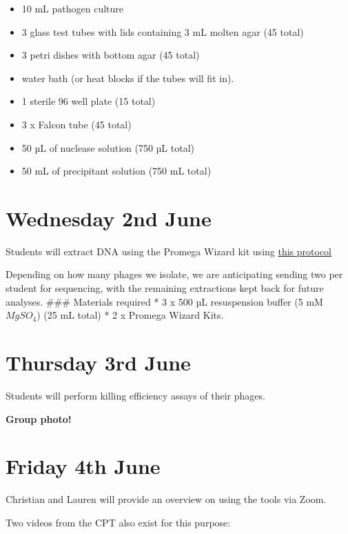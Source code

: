 \documentclass[
]{book}
\providecommand{\tightlist}{%
  \setlength{\itemsep}{0pt}\setlength{\parskip}{0pt}}
\begin{document}
\begin{itemize}
\tightlist
\item
  10 mL pathogen culture
\item
  3 glass test tubes with lids containing 3 mL molten agar (45 total)
\item
  3 petri dishes with bottom agar (45 total)
\item
  water bath (or heat blocks if the tubes will fit in).
\item
  1 sterile 96 well plate (15 total)
\item
  3 x Falcon tube (45 total)
\item
  50 µL of nuclease solution (750 µL total)
\item
  50 mL of precipitant solution (750 mL total)
\end{itemize}

\hypertarget{wednesday-2nd-june}{%
\section{Wednesday 2nd June}\label{wednesday-2nd-june}}

Students will extract DNA using the Promega Wizard kit using \href{https://cpt.tamu.edu/wordpress/wp-content/uploads/2011/12/Phage-DNA-extraction-modified-Wizard-method-07-12-2011.pdf}{this protocol}

Depending on how many phages we isolate, we are anticipating sending two per student for sequencing, with the remaining extractions kept back for future analyses.
\#\#\# Materials required
* 3 x 500 µL resuspension buffer (5 mM \(MgSO_{4}\)) (25 mL total)
* 2 x Promega Wizard Kits.

\hypertarget{thursday-3rd-june}{%
\section{Thursday 3rd June}\label{thursday-3rd-june}}

Students will perform killing efficiency assays of their phages.

\textbf{Group photo!}

\hypertarget{friday-4th-june}{%
\section{Friday 4th June}\label{friday-4th-june}}

Christian and Lauren will provide an overview on using the tools via Zoom.

Two videos from the CPT also exist for this purpose:
\end{document}
